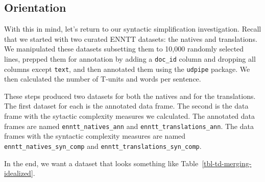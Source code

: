 \documentclass[
  letterpaper,
  DIV=11,
  numbers=noendperiod]{scrreport}
\theoremstyle{definition}
\theoremstyle{remark}
\begin{document}
\hypertarget{sec-td-merging-orientation}{%
\subsection{Orientation}\label{sec-td-merging-orientation}}

With this in mind, let's return to our syntactic simplification
investigation. Recall that we started with two curated ENNTT datasets:
the natives and translations. We manipulated these datasets subsetting
them to 10,000 randomly selected lines, prepped them for annotation by
adding a \texttt{doc\_id} column and dropping all columns except
\texttt{text}, and then annotated them using the \texttt{udpipe}
package. We then calculated the number of T-units and words per
sentence.

These steps produced two datasets for both the natives and for the
translations. The first dataset for each is the annotated data frame.
The second is the data frame with the sytactic complexity measures we
calculated. The annotated data frames are named
\texttt{enntt\_natives\_ann} and \texttt{enntt\_translations\_ann}. The
data frames with the syntactic complexity measures are named
\texttt{enntt\_natives\_syn\_comp} and
\texttt{enntt\_translations\_syn\_comp}.

In the end, we want a dataset that looks something like
Table~\ref{tbl-td-merging-idealized}.
\end{document}
